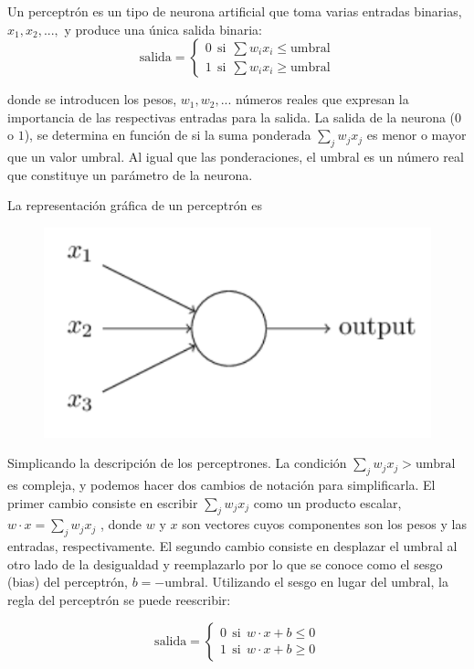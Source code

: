 
Un perceptrón es un tipo de neurona artificial que toma varias entradas binarias, $x_1 , x_2 , . . .,$ y produce una única salida binaria:
\begin{equation}
    \text{salida}=\begin{cases}
    0~~\text{si}~~\sum w_ix_i\leq \text{umbral}\\
    1~~\text{si}~~\sum w_ix_i\geq\text{umbral}
    \end{cases}
\end{equation}

donde se introducen los pesos, $w_1, w_2 , ...$ números reales que expresan la importancia de las respectivas entradas para la salida. La salida de la neurona ($0$ o $1$), se determina en función de si la suma ponderada $\sum_j w_j x_j$ es menor o mayor que un valor umbral. Al igual que las ponderaciones, el umbral es un número real que constituye un parámetro de la neurona. 

La representación gráfica de un perceptrón es 
\begin{figure}[h!]
    \centering
    \includegraphics[width=0.25\linewidth]{imagen.png}
\end{figure}



Simplicando la descripción de los perceptrones. La condición $
\sum_j w_j x_j > \text{umbral}$ es compleja, y podemos hacer dos cambios de notación para simplificarla. El primer cambio consiste en escribir $\sum_j w_jx_j$ como un producto escalar, $w \cdot x = \sum_j w_j x_j$ , donde $w$ y $x$ son vectores cuyos componentes son los pesos y las entradas, respectivamente. El segundo cambio consiste en desplazar el umbral al otro lado de la desigualdad y reemplazarlo por lo que se conoce como el sesgo (bias) del perceptrón, $b = - \text{umbral}$. Utilizando el sesgo en lugar del umbral, la regla del perceptrón se puede reescribir:

\begin{equation}
    \text{salida}=\begin{cases}
    0~~\text{si}~~w\cdot x +b\leq 0\\
    1~~\text{si}~~w\cdot x+b\geq 0
    \end{cases}
\end{equation}




